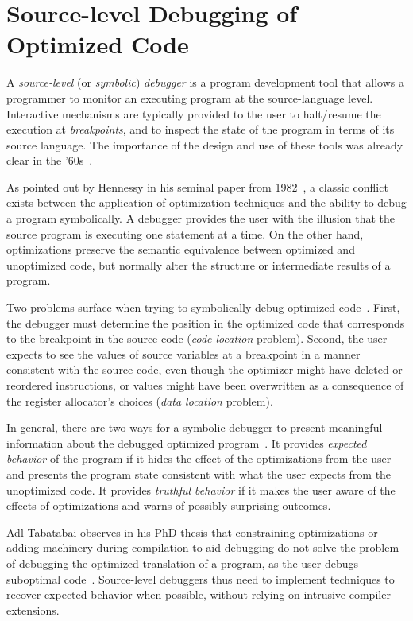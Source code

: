 \section{Source-level Debugging of Optimized Code}
A {\em source-level} (or {\em symbolic}) {\em debugger} is a program development tool that allows a programmer to monitor an executing program at the source-language level. Interactive mechanisms are typically provided to the user to halt/resume the execution at {\em breakpoints}, and to inspect the state of the program in terms of its source language. The importance of the design and use of these tools was already clear in the '60s~\cite{Evans66}.

\missing %

As pointed out by Hennessy in his seminal paper from 1982~\cite{Hennessy82}, a classic conflict exists between the application of optimization techniques and the ability to debug a program symbolically. A debugger provides the user with the illusion that the source program is executing one statement at a time. On the other hand, optimizations preserve the semantic equivalence between optimized and unoptimized code, but normally alter the structure or intermediate results of a program.

Two problems surface when trying to symbolically debug optimized code~\cite{Adl-Tabatabai96,Jaramillo00}. First, the debugger must determine the position in the optimized code that corresponds to the breakpoint in the source code ({\em code location} problem). Second, the user expects to see the values of source variables at a breakpoint in a manner consistent with the source code, even though the optimizer might have 
deleted or reordered instructions, or values might have been overwritten as a consequence of the register allocator's choices ({\em data location} problem).

In general, there are two ways for a symbolic debugger to present meaningful information about the debugged optimized program~\cite{Wu99}. It provides {\em expected behavior} of the program if it hides the effect of the optimizations from the user and presents the program state consistent with what the user expects from the unoptimized code. It provides {\em truthful behavior} if it makes the user aware of the effects of optimizations and warns of possibly surprising outcomes.

Adl-Tabatabai observes in his PhD thesis that constraining optimizations or adding machinery during compilation to aid debugging do not solve the problem of debugging the optimized translation of a program, as the user debugs suboptimal code~\cite{Adl-Tabatabai96thesis}. Source-level debuggers thus need to implement techniques to recover expected behavior when possible, without relying on intrusive compiler extensions.

